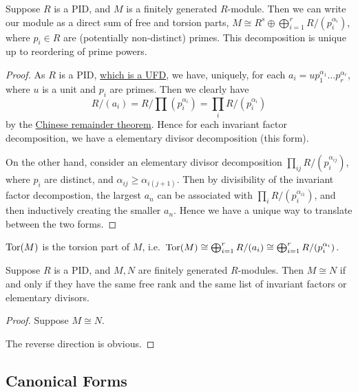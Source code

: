 \begin{theorem}\label{thm:structure-divisor}
    Suppose \(R\) is a PID,
    and \(M\) is a finitely generated \(R\)-module.
    Then we can write our module as a direct sum of free and torsion parts,
    \(M \cong R^s \oplus \bigoplus_{i=1}^r R/(p_i^{\alpha_i})\),
    where \(p_i \in R\) are (potentially non-distinct) primes.
    This decomposition is unique up to reordering of prime powers.
\end{theorem}
\begin{proof}
    As \(R\) is a PID, \hyperref[thm:pid-ufd]{which is a UFD},
    we have, uniquely, for each \(a_i = up_1^{\alpha_1} \hdots p_r^{\alpha_r}\),
    where \(u\) is a unit and \(p_i\) are primes.
    Then we clearly have
    \begin{equation*}
        R/(a_i) = R/\prod (p_i^{\alpha_i})
        = \prod_i R/(p_i^{\alpha_i})
    \end{equation*}
    by the \hyperref[thm:chinese]{Chinese remainder theorem}.
    Hence for each invariant factor decomposition,
    we have a elementary divisor decomposition (this form).

    On the other hand, consider an elementary divisor decomposition
    \(\prod_{ij} R/(p_i^{\alpha_{ij}})\), where \(p_i\) are distinct,
    and \(\alpha_{ij} \geq \alpha_{i(j+1)}\).
    Then by divisibility of the invariant factor decompostion,
    the largest \(a_n\) can be associated with \(\prod_i R/(p_i^{\alpha_{i1}})\),
    and then inductively creating the smaller \(a_n\).
    Hence we have a unique way to translate between the two forms.
\end{proof}

\begin{definition}
    \(\operatorname{Tor}(M)\) is the torsion part of \(M\),
    i.e.\ \(\operatorname{Tor}(M) \cong \bigoplus_{i=1}^r R/(a_i) \cong \bigoplus_{i=1}^r R/(p_i^{\alpha_i})\).
\end{definition}

\begin{theorem}\label{thm:structure-uniqueness}
    Suppose \(R\) is a PID,
    and \(M,N\) are finitely generated \(R\)-modules.
    Then \(M \cong N\) if and only if they have the same free rank
    and the same list of invariant factors or elementary divisors.
\end{theorem}
\begin{proof}
    Suppose \(M \cong N\).

    The reverse direction is obvious.
\end{proof}

\subsection*{Canonical Forms}
